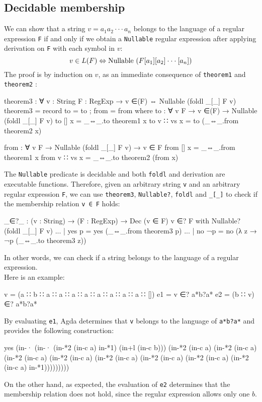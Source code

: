 \subsection{Decidable membership}
We can show that a string $v = a_1 a_2 \cdot\cdot\cdot a_n$ belongs to the language of a regular expression \texttt{F} if and only if we obtain a \texttt{Nullable} regular expression after applying derivation on \texttt{F} with each symbol in $v$: 
$$v \in L(F) \Leftrightarrow \operatorname{Nullable} \ (F [a_1][a_2]\cdot\cdot\cdot[a_n]) $$
The proof is by induction on $v$, as an immediate consequence of \texttt{theorem1} and \texttt{theorem2} :
\begin{agda}
theorem3 : ∀ {v : String} {F : RegExp}
  → v ∈(F) ⇔ Nullable (foldl _[_] F v)
theorem3 = record { to = to ; from = from }
  where
    to : ∀ {v} {F} → v ∈(F) → Nullable (foldl _[_] F v)
    to {[]} x     = _⇔_.to theorem1 x
    to {v ∷ vs} x = to (_⇔_.from theorem2 x)

    from : ∀ {v} {F} → Nullable (foldl _[_] F v) → v ∈ F
    from {[]} x     = _⇔_.from theorem1 x
    from {v ∷ vs} x = _⇔_.to theorem2 (from x)
\end{agda}
The \texttt{Nullable} predicate is decidable and both \texttt{foldl} and derivation are executable functions. 
Therefore, given an arbitrary string \texttt{v} and an arbitrary regular expression \texttt{F}, we can use \texttt{theorem3}, \texttt{Nullable?}, \texttt{foldl} and \texttt{\_[\_]} to check if the membership relation \texttt{v ∈ F} holds:
\begin{agda}
_∈?_ : (v : String) → (F : RegExp) → Dec (v ∈ F)
v ∈? F with Nullable? (foldl _[_] F v)
... | yes p = yes (_⇔_.from theorem3 p)
... | no ¬p = no (λ z → ¬p (_⇔_.to theorem3 z))
\end{agda}
In other words, we can check if a string belongs to the language of a regular expression.\\
Here is an example:
\begin{agda}
v = (a ∷ b ∷ a ∷ a ∷ a ∷ a ∷ a ∷ a ∷ a ∷ a ∷ [])
e1 = v ∈? a*b?a*
e2 = (b ∷ v) ∈? a*b?a*
\end{agda}
By evaluating \texttt{e1}, Agda determines that \texttt{v} belongs to the language of \texttt{a*b?a*} and provides the following construction:
\begin{agda}
yes
  (in-· (in-· (in-*2 (in-c a) in-*1) (in+l (in-c b)))
      (in-*2 (in-c a)
       (in-*2 (in-c a)
        (in-*2 (in-c a)
         (in-*2 (in-c a)
          (in-*2 (in-c a)
           (in-*2 (in-c a)
            (in-*2 (in-c a) 
             (in-*2 (in-c a) in-*1)))))))))
\end{agda}
On the other hand, as expected, the evaluation of \texttt{e2} determines that the membership relation does not hold, since the regular expression allows only one $b$.